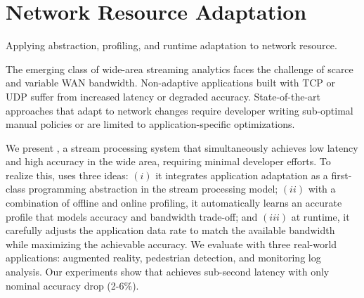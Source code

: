 \documentclass[thesis.tex]{subfiles}
\begin{document}
\chapter{Network Resource Adaptation}
\label{cha:netw-reso-adapt}

Applying abstraction, profiling, and runtime adaptation to network resource.

The emerging class of wide-area streaming analytics faces the challenge of
scarce and variable WAN bandwidth. Non-adaptive applications built with TCP or
UDP suffer from increased latency or degraded accuracy. State-of-the-art
approaches that adapt to network changes require developer writing sub-optimal
manual policies or are limited to application-specific optimizations.

We present \sysname{}, a stream processing system that simultaneously achieves
low latency and high accuracy in the wide area, requiring minimal developer
efforts. To realize this, \sysname{} uses three ideas: $(i)$ it integrates
application adaptation as a first-class programming abstraction in the stream
processing model; $(ii)$ with a combination of offline and online profiling, it
automatically learns an accurate profile that models accuracy and bandwidth
trade-off; and $(iii)$ at runtime, it carefully adjusts the application data
rate to match the available bandwidth while maximizing the achievable
accuracy. We evaluate \sysname{} with three real-world applications: augmented
reality, pedestrian detection, and monitoring log analysis. Our experiments show
that \sysname{} achieves sub-second latency with only nominal accuracy drop
(2-6\%).











\end{document}
